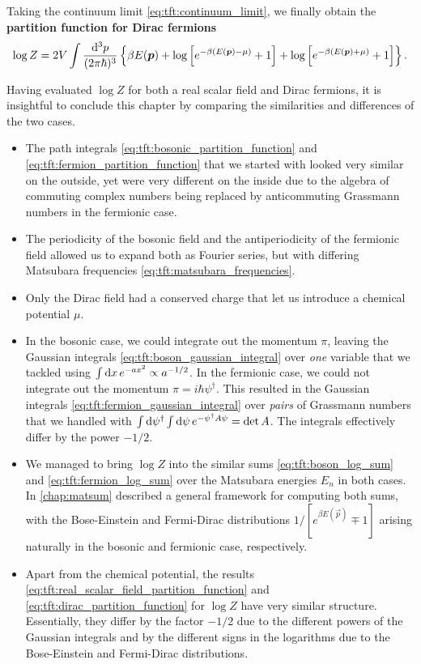 Taking the continuum limit \eqref{eq:tft:continuum_limit}, we finally obtain the \textbf{partition function for Dirac fermions}
\begin{equation}
	\log Z = 2 V \int \frac{\mathop{}\!\mathrm{d}^3 p}{(2 \pi \hbar)^3} \left\{ \beta E({\bm{p}}) + \log \left[ e^{-\beta (E({\bm{p}}) - \mu)}+1 \right] + \log \left[ e^{-\beta (E({\bm{p}}) + \mu)} + 1\right] \right\} .
\label{eq:tft:dirac_partition_function}
\end{equation}

Having evaluated $\log Z$ for both a real scalar field and Dirac fermions, it is insightful to conclude this chapter by comparing the similarities and differences of the two cases.
\begin{itemize}
\item The path integrals \eqref{eq:tft:bosonic_partition_function} and \eqref{eq:tft:fermion_partition_function} that we started with looked very similar on the outside, yet were very different on the inside due to the algebra of commuting complex numbers being replaced by anticommuting Grassmann numbers in the fermionic case.
\item The periodicity of the bosonic field and the antiperiodicity of the fermionic field allowed us to expand both as Fourier series, but with differing Matsubara frequencies \eqref{eq:tft:matsubara_frequencies}.
\item Only the Dirac field had a conserved charge that let us introduce a chemical potential $\mu$.
\item In the bosonic case, we could integrate out the momentum $\pi$, leaving the Gaussian integrals \eqref{eq:tft:boson_gaussian_integral} over \emph{one} variable that we tackled using $\int \mathop{}\!\mathrm{d} x \, e^{-ax^2} \propto a^{-1/2}$.
      In the fermionic case, we could not integrate out the momentum $\pi = i \hbar \psi^\dagger$.
      This resulted in the Gaussian integrals \eqref{eq:tft:fermion_gaussian_integral} over \emph{pairs} of Grassmann numbers that we handled with $\int \mathop{}\!\mathrm{d} \psi^\dagger \int \mathop{}\!\mathrm{d} \psi \, e^{-\psi^\dagger A \psi} = \operatorname{det} A$.
	  The integrals effectively differ by the power $-1/2$.
\item We managed to bring $\log Z$ into the similar sums \eqref{eq:tft:boson_log_sum} and \eqref{eq:tft:fermion_log_sum} over the Matsubara energies $E_n$ in both cases.
      In \cref{chap:matsum} described a general framework for computing both sums, with the Bose-Einstein and Fermi-Dirac distributions $1 / [e^{\beta E(\vec{p})} \mp 1]$ arising naturally in the bosonic and fermionic case, respectively.
\item Apart from the chemical potential, the results \eqref{eq:tft:real_scalar_field_partition_function} and \eqref{eq:tft:dirac_partition_function} for $\log Z$ have very similar structure.
      Essentially, they differ by the factor $-1/2$ due to the different powers of the Gaussian integrals and by the different signs in the logarithms due to the Bose-Einstein and Fermi-Dirac distributions.
\end{itemize}





